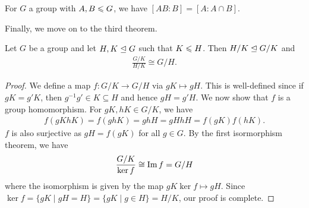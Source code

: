 \begin{corollary}
    For $G$ a group with $A,B \leqslant G$, we have $[AB:B] = [A:A \cap B]$.
\end{corollary}

Finally, we move on to the third theorem.

\begin{theorem}
    Let $G$ be a group and let $H,K \trianglelefteq G$ such that $K \leqslant H$. Then $H/K \trianglelefteq G/K$ and
    \begin{align}
        \frac{G/K}{H/K} \cong G/H.
    \end{align}
\end{theorem}

\begin{proof}
    We define a map $f:G/K \to G/H$ via $gK \mapsto gH$. This is well-defined since if $gK = g'K$, then $g^{-1}g' \in K \subseteq H$ and hence $gH = g'H$. We now show that $f$ is a group homomorphism. For $gK,hK \in G/K$, we have
    \begin{align}
        f(gKhK) = f(ghK) = ghH = gHhH = f(gK)f(hK).
    \end{align}
    $f$ is also surjective as $gH = f(gK)$ for all $g \in G$. By the first isormorphism theorem, we have
    \begin{align}
        \frac{G/K}{\ker f} \cong \operatorname{Im} f = G/H
    \end{align}
    where the isomorphism is given by the map $gK \ker f \mapsto gH$. Since $\ker f = \{gK \mid gH = H\} = \{gK \mid g \in H\} = H/K$, our proof is complete.
\end{proof}